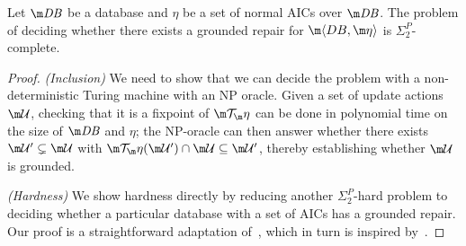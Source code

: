 \begin{proposition}
  \label{prop:grounded-complexity}
  Let $\db$ be a database and $\eta$ be a set of normal AICs over $\db$.
  The problem of deciding whether there exists a  grounded repair for $\fulldb$ is $\Sigma^P_2$-complete.
\end{proposition}
\begin{proof}
  \emph{(Inclusion)} We need to show that we can decide the problem with a non-deterministic Turing machine with an NP oracle.
  Given a set of update actions $\UU$, checking that it is a fixpoint of $\Op$ can be done in polynomial time on the size of $\db$ and $\eta$; the NP-oracle can then answer whether there exists $\UU'\subsetneq\UU$ with $\Op(\UU')\cap\UU\subseteq\UU'$, thereby establishing whether $\UU$ is grounded.

  \emph{(Hardness)}
  We show hardness directly by reducing another $\Sigma^P_2$-hard problem to deciding whether a particular database with a set of AICs has a grounded repair.  Our proof is a straightforward adaptation of~\citep[Theorem~5.7]{ai/BogaertsVD15}, which in turn is inspired by~\citep[Theorem 6.12]{DeneckerMT04}.


\end{proof}

